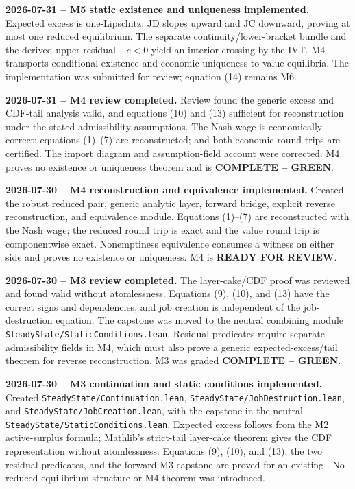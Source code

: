 \documentclass[10pt]{article}
\newcommand{\code}[1]{\texttt{\detokenize{#1}}}
\begin{document}
\textbf{2026-07-31 -- M5 static existence and uniqueness implemented.}
Expected excess is one-Lipschitz; JD slopes upward and JC downward, proving
at most one reduced equilibrium. The separate continuity/lower-bracket bundle
and the derived upper residual \(-c<0\) yield an interior crossing by the IVT.
M4 transports conditional existence and economic uniqueness to value
equilibria. The implementation was submitted for review; equation (14)
remains M6.

\textbf{2026-07-31 -- M4 review completed.}
Review found the generic excess and CDF-tail analysis valid, and equations
(10) and (13) sufficient for reconstruction under the stated admissibility
assumptions. The Nash wage is economically correct; equations (1)--(7) are
reconstructed; and both economic round trips are certified. The import
diagram and assumption-field account were corrected. M4 proves no existence
or uniqueness theorem and is \textbf{COMPLETE -- GREEN}.

\textbf{2026-07-30 -- M4 reconstruction and equivalence implemented.}
Created the robust reduced pair, generic analytic layer, forward bridge,
explicit reverse reconstruction, and equivalence module. Equations (1)--(7)
are reconstructed with the Nash wage; the reduced round trip is exact and the
value round trip is componentwise exact. Nonemptiness equivalence consumes a
witness on either side and proves no existence or uniqueness. M4 is
\textbf{READY FOR REVIEW}.

\textbf{2026-07-30 -- M3 review completed.}
The layer-cake/CDF proof was reviewed and found valid without atomlessness.
Equations (9), (10), and (13) have the correct signs and dependencies, and job
creation is independent of the job-destruction equation. The capstone was
moved to the neutral combining module
\nolinkurl{SteadyState/StaticConditions.lean}. Residual predicates require
separate admissibility fields in M4, which must also prove a generic
expected-excess/tail theorem for reverse reconstruction. M3 was graded
\textbf{COMPLETE -- GREEN}.

\textbf{2026-07-30 -- M3 continuation and static conditions implemented.}
Created \nolinkurl{SteadyState/Continuation.lean},
\nolinkurl{SteadyState/JobDestruction.lean}, and
\nolinkurl{SteadyState/JobCreation.lean}, with the capstone in the neutral
\nolinkurl{SteadyState/StaticConditions.lean}. Expected excess follows from
the M2 active-surplus formula; Mathlib's strict-tail layer-cake theorem gives
the CDF representation without atomlessness. Equations (9), (10), and (13),
the two residual predicates, and the forward M3 capstone are proved for an
existing \code{ValueEquilibrium}. No reduced-equilibrium structure or M4
theorem was introduced.
\end{document}
